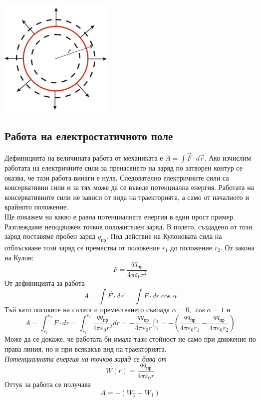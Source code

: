 \documentclass[fleqn, 12pt]{article}
\theoremstyle{definition}
\begin{document}
\begin{center}
  \includegraphics{Pics/physics/lec6-5-3.png}
\end{center}

\subsection{Работа на електростатичното поле}
Дефиницията на величината работа от механиката е $A = \int \vec{F} \cdot d \vec{r}$. Ако изчислим
работата на електричните сили за пренасянето на заряд по затворен контур се оказва, че
тази работа винаги е нула. Следователно електричните сили са консервативни сили и за
тях може да се въведе потенциална енергия. Работата на консервативните сили не
зависи от вида на траекторията, а само от началното и крайното положение.\\
Ще покажем на какво е равна потенциалната енергия в един прост пример.
Разглеждаме неподвижен точков положителен заряд. В полето, създадено от този заряд
поставяме пробен заряд $q_{\text{пр}}$. Под действие на Кулоновата сила на отблъскване този
заряд се премества от положение $r_1$ до положение $r_2$. От закона на Кулон:
$$F = \frac{q q_{\text{пр}}}{4 \pi \varepsilon_0 r^2}$$
От дефиницията за работа 
$$A = \int \vec{F} \cdot d \vec{r} = \int F \cdot dr \cos \alpha$$
Тъй като посоките на силата и преместването съвпада $\alpha = 0, \, \cos \alpha = 1$ и 
$$A = \int_{r_1} ^{r_2} F \cdot dr = \int_{r_1} ^{r_2} \frac{q q_{\text{пр}}}{4 \pi \varepsilon_0 r^2} dr = - \frac{q q_{\text{пр}}}{4 \pi \varepsilon_0 r} \Big|_{r_1} ^{r_2} = - \left(\frac{q q_{\text{пр}}}{4 \pi \varepsilon_0 r_1} - \frac{q q_{\text{пр}}}{4 \pi \varepsilon_0 r_2} \right)$$
Може да се докаже, че работата би имала тази стойност не само при движение по права
линия, но и при всякакъв вид на траекторията. \\
\textit{Потенциалната енергия на точков заряд се дава от}
$$W(r) =  \frac{q q_{\text{пр}}}{4 \pi \varepsilon_0 r}$$
Оттук за работа се получава 
$$A = - (W_2 - W_1)$$
\end{document}
